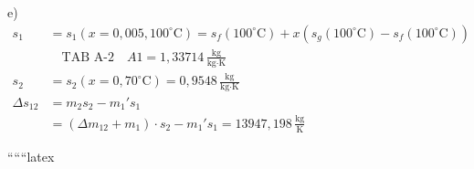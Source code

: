 e)
\begin{align*}
s_1 &= s_1 \left( x = 0,005, 100^\circ \text{C} \right) = s_f (100^\circ \text{C}) + x \left( s_g (100^\circ \text{C}) - s_f (100^\circ \text{C}) \right) \\
&\quad \boxed{\text{TAB A-2}} \quad A1 = 1,33714 \, \frac{\text{kg}}{\text{kg} \cdot \text{K}} \\
s_2 &= s_2 \left( x = 0,70^\circ \text{C} \right) = 0,9548 \, \frac{\text{kg}}{\text{kg} \cdot \text{K}} \\
\Delta s_{12} &= m_2 s_2 - m_1' s_1 \\
&= (\Delta m_{12} + m_1) \cdot s_2 - m_1' s_1 = 13947,198 \, \frac{\text{kg}}{\text{K}}
\end{align*}

``````latex